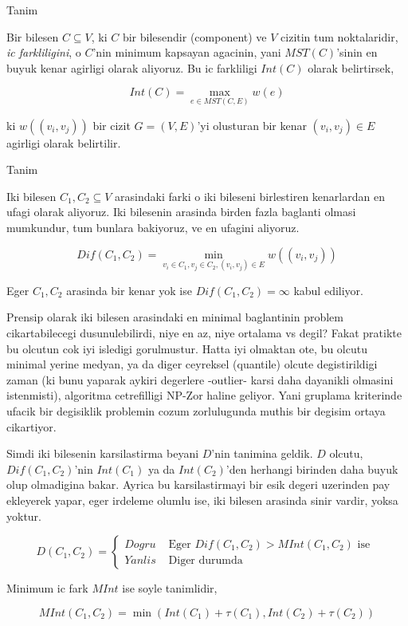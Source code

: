 \documentclass[12pt,fleqn]{article}\usepackage{../common}
\begin{document}
Tanim

Bir bilesen $C \subseteq V$, ki $C$ bir bilesendir (component) ve $V$ cizitin tum
noktalaridir, {\em ic farkliligini}, o $C$'nin minimum kapsayan agacinin,
yani $MST(C)$'sinin en buyuk kenar agirligi olarak aliyoruz. Bu ic farkliligi
$Int(C)$ olarak belirtirsek, 

$$ Int(C) = \max_{e \in MST(C,E)} w(e) $$

ki $w((v_i , v_j))$ bir cizit $G = (V,E)$'yi olusturan bir kenar $(v_i,v_j)
\in E$ agirligi 
olarak belirtilir. 

Tanim

Iki bilesen $C_1,C_2 \subseteq V$ arasindaki farki o iki bileseni
birlestiren kenarlardan en ufagi olarak aliyoruz. Iki bilesenin arasinda
birden fazla baglanti olmasi mumkundur, tum bunlara bakiyoruz, ve en
ufagini aliyoruz.

$$ Dif(C_1,C_2) = \min_{v_i \in C_1, v_j \in C_2, (v_i,v_j) \in E} w((v_i,v_j))$$

Eger $C_1,C_2$ arasinda bir kenar yok ise $Dif(C_1,C_2) = \infty$ kabul
ediliyor. 

Prensip olarak iki bilesen arasindaki en minimal baglantinin problem
cikartabilecegi dusunulebilirdi, niye en az, niye ortalama vs degil? Fakat
pratikte bu olcutun cok iyi isledigi gorulmustur. Hatta iyi olmaktan ote,
bu olcutu minimal yerine medyan, ya da diger ceyreksel (quantile) olcute
degistirildigi zaman (ki bunu yaparak aykiri degerlere -outlier- karsi daha
dayanikli olmasini istenmisti), algoritma cetrefilligi NP-Zor haline
geliyor. Yani gruplama kriterinde ufacik bir degisiklik problemin cozum
zorlulugunda muthis bir degisim ortaya cikartiyor.

Simdi iki bilesenin karsilastirma beyani $D$'nin tanimina geldik. $D$ olcutu,
$Dif(C_1,C_2)$'nin $Int(C_1)$ ya da $Int(C_2)$'den herhangi birinden daha
buyuk olup olmadigina bakar. Ayrica bu karsilastirmayi bir esik degeri
uzerinden pay ekleyerek yapar, eger irdeleme olumlu ise, iki bilesen
arasinda sinir vardir, yoksa yoktur.

$$ 
D(C_1,C_2) = 
\left\{ \begin{array}{ll}
Dogru & \textrm{ Eger } Dif(C_1,C_2) > MInt(C_1,C_2) \textrm{ ise } \\
Yanlis & \textrm{ Diger durumda }
\end{array} \right.
 $$

Minimum ic fark $MInt$ ise soyle tanimlidir,

$$ 
MInt(C_1,C_2) = \min (Int(C_1)+\tau(C_1), Int(C_2)+\tau(C_2))
 $$
\end{document}
